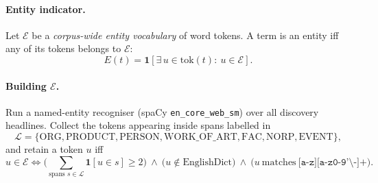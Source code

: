 \documentclass[11pt]{article}
\newcommand{\ind}[1]{\mathbf{1}\!\left[#1\right]}        %
\newcommand{\Ent}{\mathcal{E}}                            %
\theoremstyle{definition}
\theoremstyle{remark}
\begin{document}
\paragraph{Entity indicator.}
Let $\Ent$ be a \emph{corpus-wide entity vocabulary} of word tokens. A term is an entity iff
any of its tokens belongs to $\Ent$:
\begin{equation}
E(t)=\ind{\exists\,u\in\mathrm{tok}(t):\ u\in\Ent}.
\label{eq:isentity}
\end{equation}

\paragraph{Building $\Ent$.}
Run a named-entity recogniser (spaCy \texttt{en\_core\_web\_sm}) over all discovery
headlines. Collect the tokens appearing inside spans labelled in
\[
\mathcal{L}=\{\text{ORG},\text{PRODUCT},\text{PERSON},\text{WORK\_OF\_ART},\text{FAC},\text{NORP},\text{EVENT}\},
\]
and retain a token $u$ iff
\begin{equation}
u\in\Ent \iff
\bigl(\textstyle\sum_{\text{spans }s\in\mathcal{L}} \ind{u\in s}\ge 2\bigr)\ \wedge\
\bigl(u\notin \text{EnglishDict}\bigr)\ \wedge\ \bigl(u\ \text{matches}\ \texttt{[a-z][a-z0-9'\textbackslash-]+}\bigr).
\label{eq:vocab}
\end{equation}
\end{document}
